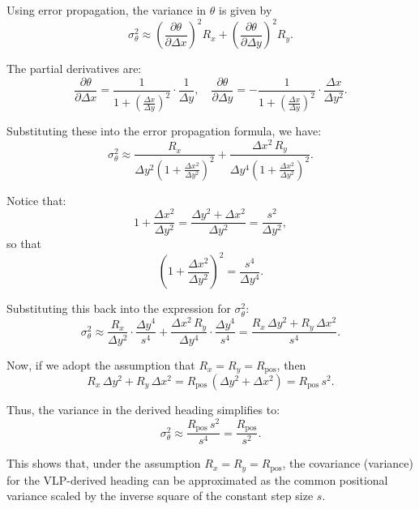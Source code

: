 Using error propagation, the variance in \(\theta\) is given by
\[
\sigma_\theta^2 \approx \left(\frac{\partial \theta}{\partial \Delta x}\right)^2 R_x + \left(\frac{\partial \theta}{\partial \Delta y}\right)^2 R_y.
\]

The partial derivatives are:
\[
\frac{\partial \theta}{\partial \Delta x} = \frac{1}{1 + \left(\frac{\Delta x}{\Delta y}\right)^2} \cdot \frac{1}{\Delta y}, \quad 
\frac{\partial \theta}{\partial \Delta y} = -\frac{1}{1 + \left(\frac{\Delta x}{\Delta y}\right)^2} \cdot \frac{\Delta x}{\Delta y^2}.
\]

Substituting these into the error propagation formula, we have:
\[
\sigma_\theta^2 \approx \frac{R_x}{\Delta y^2 \left( 1 + \frac{\Delta x^2}{\Delta y^2} \right)^2} + \frac{\Delta x^2 \, R_y}{\Delta y^4 \left( 1 + \frac{\Delta x^2}{\Delta y^2} \right)^2}.
\]

Notice that:
\[
1 + \frac{\Delta x^2}{\Delta y^2} = \frac{\Delta y^2 + \Delta x^2}{\Delta y^2} = \frac{s^2}{\Delta y^2},
\]
so that
\[
\left(1 + \frac{\Delta x^2}{\Delta y^2}\right)^2 = \frac{s^4}{\Delta y^4}.
\]

Substituting this back into the expression for \(\sigma_\theta^2\):
\[
\sigma_\theta^2 \approx \frac{R_x}{\Delta y^2} \cdot \frac{\Delta y^4}{s^4} + \frac{\Delta x^2 \, R_y}{\Delta y^4} \cdot \frac{\Delta y^4}{s^4}
= \frac{R_x \, \Delta y^2 + R_y \, \Delta x^2}{s^4}.
\]

Now, if we adopt the assumption that \( R_x = R_y = R_{\text{pos}} \), then
\[
R_x \, \Delta y^2 + R_y \, \Delta x^2 = R_{\text{pos}} \, (\Delta y^2 + \Delta x^2) = R_{\text{pos}} \, s^2.
\]

Thus, the variance in the derived heading simplifies to:
\[
\sigma_\theta^2 \approx \frac{R_{\text{pos}} \, s^2}{s^4} = \frac{R_{\text{pos}}}{s^2}.
\]

This shows that, under the assumption \( R_x = R_y = R_{\text{pos}} \), the covariance (variance) for the VLP-derived heading can be approximated as the common positional variance scaled by the inverse square of the constant step size \( s \).
